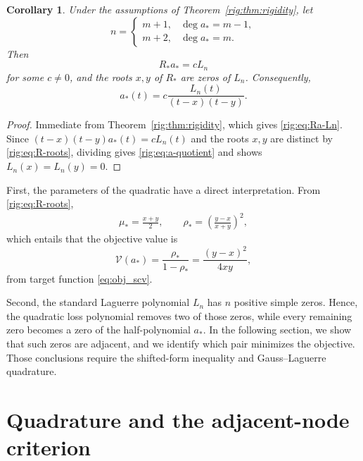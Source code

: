 \documentclass[11pt]{article}
\numberwithin{equation}{section}
\newtheorem{corollary}[theorem]{Corollary}
\theoremstyle{definition}
\theoremstyle{remark}
\newcommand{\Vcal}{\mathcal V}
\newcommand{\Lag}{L}
\begin{document}
\begin{corollary}\label{rig:cor:deletion}
Under the assumptions of Theorem~\ref{rig:thm:rigidity}, let
\[
    n=
    \begin{cases}
        m+1,&\deg a_*=m-1,\\
        m+2,&\deg a_*=m.
    \end{cases}
\]
Then
\begin{equation}\label{rig:eq:Ra-Ln}
    R_*a_*=c\Lag_n
\end{equation}
for some \(c\neq0\), and the roots \(x,y\) of \(R_*\) are zeros of \(\Lag_n\). Consequently,
\begin{equation}\label{rig:eq:a-quotient}
    a_*(t)
    =c\frac{\Lag_n(t)}{(t-x)(t-y)}.
\end{equation}
\end{corollary}

\begin{proof}
Immediate from Theorem~\ref{rig:thm:rigidity}, which gives \eqref{rig:eq:Ra-Ln}. Since \((t-x)(t-y)a_*(t)=c\Lag_n(t)\) and the roots \(x,y\) are distinct by \eqref{rig:eq:R-roots}, dividing gives \eqref{rig:eq:a-quotient} and shows \(\Lag_n(x)=\Lag_n(y)=0\).
\end{proof}
First, the parameters of the quadratic have a direct interpretation. From \eqref{rig:eq:R-roots},
\begin{align*}
    \mu_* = \frac{x+y}{2},
    \qquad
    \rho_* = \left(\frac{y-x}{x+y}\right)^2,
\end{align*}
which entails that the objective value is
\begin{equation}\label{rig:eq:scv-roots}
    \Vcal(a_*)
    =\frac{\rho_*}{1-\rho_*}
    =\frac{(y-x)^2}{4xy},
\end{equation}
from target function \eqref{eq:obj_scv}.

Second, the standard Laguerre polynomial \(\Lag_n\) has \(n\) positive simple zeros. Hence, the quadratic loss polynomial removes two of those zeros, while every remaining zero becomes a zero of the half-polynomial \(a_*\). In the following section, we show that such zeros are adjacent, and we identify which pair minimizes the objective. Those conclusions require the shifted-form inequality and Gauss--Laguerre quadrature.





\section{Quadrature and the adjacent-node criterion}\label{sec:adjacency}
\end{document}
